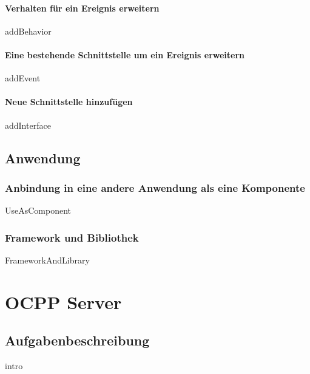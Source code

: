 \documentclass{article}
\begin{document}
            \paragraph{Verhalten für ein Ereignis erweitern}
            \label{Verhalten für ein Ereignis erweitern}
                {addBehavior}
    
            \paragraph{Eine bestehende Schnittstelle um ein Ereignis erweitern}
                {addEvent}
            \newpage
            \paragraph{Neue Schnittstelle hinzufügen}
                {addInterface}


    \newpage
    \subsection{Anwendung}
        \subsubsection{Anbindung in eine andere Anwendung als eine Komponente}
            {UseAsComponent}

        \newpage
        \subsubsection{Framework und Bibliothek}
            {FrameworkAndLibrary}
\newpage



\section{OCPP Server}
    \subsection{Aufgabenbeschreibung}
    \label{kap:taskDescription}
        {intro}
\end{document}
